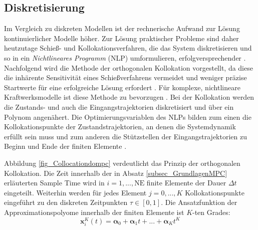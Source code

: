 \subsection{Diskretisierung} \label{subsec_Diskretisierung}
Im Vergleich zu diskreten Modellen ist der rechnerische Aufwand zur Lösung kontinuierlicher Modelle höher.
Zur Lösung praktischer Probleme sind daher heutzutage Schieß- und Kollokationsverfahren, die das System diskretisieren und so in ein \textit{Nichtlineares Programm} (NLP) umformulieren, erfolgversprechender \cite[S.63]{DissGall}.
Nachfolgend wird die Methode der orthogonalen Kollokation vorgestellt, da diese die inhärente Sensitivität eines Schießverfahrens vermeidet und weniger präzise Startwerte für eine erfolgreiche Lösung erfordert \cite[S.981]{Enright}.
Für komplexe, nichtlineare Kraftwerksmodelle ist diese Methode zu bevorzugen \cite[S.247]{Bausa}.
Bei der Kollokation werden die Zustands- und auch die Eingangstrajektorien diskretisiert und über ein Polynom angenähert.
Die Optimierungsvariablen des NLPs bilden zum einen die Kollokationspunkte der Zustandstrajektorien, an denen die Systemdynamik erfüllt sein muss und zum anderen die Stützstellen der Eingangstrajektorien zu Beginn und Ende der finiten Elemente \cite[S.63-64]{DissGall}\cite[S.2]{Cizniar}.

Abbildung \ref{fig_Collocationdompc} verdeutlicht das Prinzip der orthogonalen Kollokation.
Die Zeit innerhalb der in Absatz \ref{subsec_GrundlagenMPC} erläuterten Sample Time wird in $i = 1,...,\mathrm{NE}$ finite Elemente der Dauer $\Delta t$ eingeteilt.
Weiterhin werden für jedes Element $j = 0,...,K$ Kollokationspunkte eingeführt zu den diskreten Zeitpunkten $\tau\in [0,1]$.
Die Ansatzfunktion der Approximationspolyome innerhalb der finiten Elemente ist $K$-ten Grades:
\begin{equation} \label{eq_AnsatzApprox}
    \boldsymbol{x}^{K}_{i}(t) = \boldsymbol{\alpha}_0+\boldsymbol{\alpha}_1t+...+\boldsymbol{\alpha}_{K}t^{K}
\end{equation}

